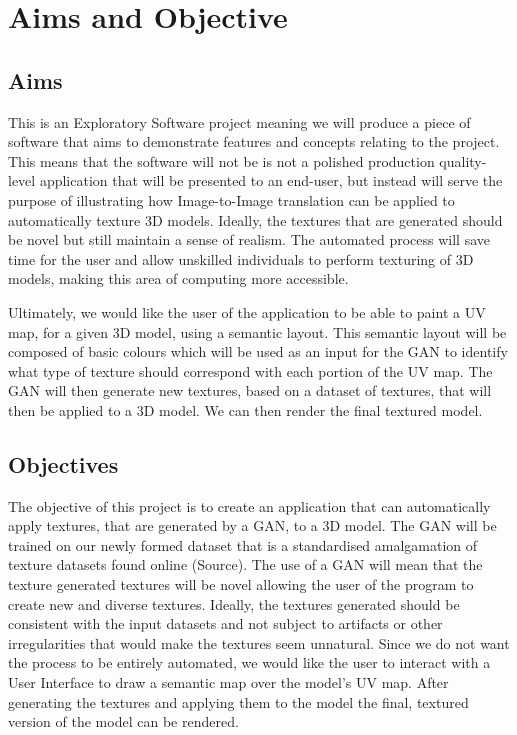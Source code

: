 \section{Aims and Objective}
\label{sec:aimsandobjectives}
\subsection{Aims}
\label{subsec:aims}
This is an Exploratory Software project meaning we will produce a piece of software that aims to demonstrate features and concepts relating to the project. This means that the software will not be is not a polished production quality-level application that will be presented to an end-user, but instead will serve the purpose of illustrating how Image-to-Image translation can be applied to automatically texture 3D models. Ideally, the textures that are generated should be novel but still maintain a sense of realism. The automated process will save time for the user and allow unskilled individuals to perform texturing of 3D models, making this area of computing more accessible.

\noindent Ultimately, we would like the user of the application to be able to paint a UV map, for a given 3D model, using a semantic layout. This semantic layout will be composed of basic colours which will be used as an input for the GAN to identify what type of texture should correspond with each portion of the UV map. The GAN will then generate new textures, based on a dataset of textures, that will then be applied to a 3D model. We can then render the final textured model.
\subsection{Objectives}
\label{subsec:objectives}
The objective of this project is to create an application that can automatically apply textures, that are generated by a GAN, to a 3D model. The GAN will be trained on our newly formed dataset that is a standardised amalgamation of texture datasets found online (Source). The use of a GAN will mean that the texture generated textures will be novel allowing the user of the program to create new and diverse textures. Ideally, the textures generated should be consistent with the input datasets and not subject to artifacts or other irregularities that would make the textures seem unnatural. Since we do not want the process to be entirely automated, we would like the user to interact with a User Interface to draw a semantic map over the model’s UV map. After generating the textures and applying them to the model the final, textured version of the model can be rendered.

